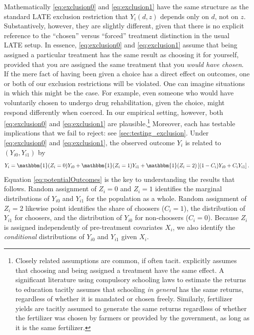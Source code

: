 \documentclass[12pt, a4paper]{article}
\begin{document}
Mathematically \eqref{eq:exclusion0} and \eqref{eq:exclusion1} have the same structure as the standard LATE exclusion restriction that $Y_i(d,z)$ depends only on $d$, not on $z$. 
Substantively, however, they are slightly different, given that there is no explicit reference to the ``chosen'' versus ``forced'' treatment distinction in the usual LATE setup.
In essence, \eqref{eq:exclusion0} and \eqref{eq:exclusion1} assume that being assigned a particular treatment has the same result as choosing it for yourself, provided that you are assigned the same treatment that you \emph{would have chosen}. 
If the mere fact of having been given a choice has a direct effect on outcomes, one or both of our exclusion restrictions will be violated.
One can imagine situations in which this might be the case.
For example, even someone who would have voluntarily chosen to undergo drug rehabilitation, given the choice, might respond differently when coerced.
In our empirical setting, however, both \eqref{eq:exclusion0} and \eqref{eq:exclusion1} are plausible.\footnote{Closely related assumptions are common, if often tacit. \cite{chamberlain2011bayesian} explicitly assumes that choosing and being assigned a treatment have the same effect. A significant literature using compulsory schooling laws to estimate the returns to education tacitly assumes that schooling \emph{in general} has the same returns, regardless of whether it is mandated or chosen freely. Similarly, fertilizer yields are tacitly assumed to generate the same returns regardless of whether the fertilizer was chosen by farmers or provided by the government, as long as it is the same fertilizer.} 
Moreover, each has testable implications that we fail to reject: see \autoref{sec:testing_exclusion}. 
Under \eqref{eq:exclusion0} and \eqref{eq:exclusion1}, the observed outcome $Y_i$ is related to $(Y_{i0}, Y_{i1})$ by 
\begin{equation}
    Y_i = \mathbbm{1}(Z_i =0) Y_{i0} + \mathbbm{1}(Z_i = 1)  Y_{i1}  + \mathbbm{1}(Z_i = 2) \left[(1 - C_i) Y_{i0} + C_i Y_{i1} \right].
\label{eq:potentialOutcomes}
\end{equation}
Equation \ref{eq:potentialOutcomes} is the key to understanding the results that follows. 
Random assignment of $Z_i=0$ and $Z_i = 1$ identifies the marginal distributions of $Y_{i0}$ and $Y_{i1}$ for the population as a whole. 
Random assignment of $Z_i=2$ likewise point identifies the share of choosers ($C_i = 1$), the distribution of $Y_{i1}$ for choosers, and the distribution of $Y_{i0}$ for non-choosers ($C_i = 0$).
Because $Z_i$ is assigned independently of pre-treatment covariates $X_i$, we also identify the \emph{conditional} distributions of $Y_{i0}$ and $Y_{i1}$ given $X_i$. 
\end{document}
